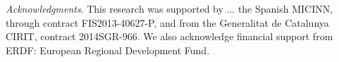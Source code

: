 \documentclass[aps,prl,twocolumn,showpacs]{revtex4}
\begin{document}

%
%  

\begin{acknowledgments}
\emph{Acknowledgments}. This research was supported by ...
the Spanish MICINN, through contract FIS2013-40627-P, and from the Generalitat de
Catalunya CIRIT, contract  2014SGR-966. We also acknowledge financial support from ERDF: European Regional Development Fund.
\end{acknowledgments}





%
%  
\end{document}

